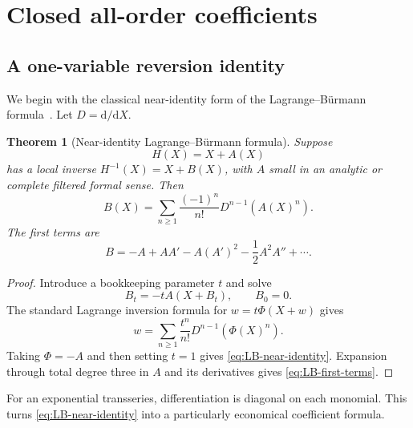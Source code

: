 \documentclass[11pt,oneside]{article}
\numberwithin{equation}{section}
\newtheorem{theorem}{Theorem}[section]
\newcommand{\dd}{\mathrm{d}}
\begin{document}
\section{Closed all-order coefficients}
\label{sec:closed-coefficients}

\subsection{A one-variable reversion identity}

We begin with the classical near-identity form of the Lagrange--B\"urmann
formula~\cite{Gessel2016,Henrici1974}.  Let \(D=\dd/\dd X\).

\begin{theorem}[Near-identity Lagrange--B\"urmann formula]
\label{thm:near-identity-LB}
Suppose
\begin{equation}
  H(X)=X+A(X)
\end{equation}
has a local inverse \(H^{-1}(X)=X+B(X)\), with \(A\) small in an analytic or
complete filtered formal sense.  Then
\begin{equation}
  \boxed{
  B(X)=\sum_{n\ge1}\frac{(-1)^n}{n!}
  D^{n-1}\!\left(A(X)^n\right).
  }
  \label{eq:LB-near-identity}
\end{equation}
The first terms are
\begin{equation}
  B=-A+AA'-A(A')^2-\frac12A^2A''+\cdots.
  \label{eq:LB-first-terms}
\end{equation}
\end{theorem}

\begin{proof}
Introduce a bookkeeping parameter \(t\) and solve
\begin{equation}
  B_t=-tA(X+B_t),
  \qquad B_0=0.
\end{equation}
The standard Lagrange inversion formula for \(w=t\Phi(X+w)\) gives
\begin{equation}
  w=\sum_{n\ge1}\frac{t^n}{n!}D^{n-1}\!\left(\Phi(X)^n\right).
\end{equation}
Taking \(\Phi=-A\) and then setting \(t=1\) gives
\cref{eq:LB-near-identity}.  Expansion through total degree three in \(A\)
and its derivatives gives \cref{eq:LB-first-terms}.
\end{proof}

For an exponential transseries, differentiation is diagonal on each monomial.
This turns \cref{eq:LB-near-identity} into a particularly economical coefficient
formula.
\end{document}
